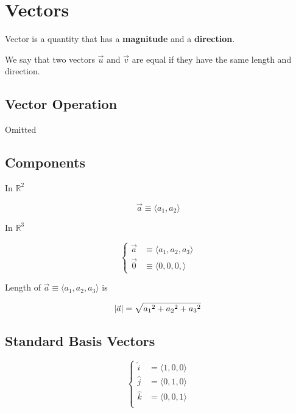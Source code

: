 \section{Vectors}

\begin{definition}[Vector]
	Vector is a quantity that has a \textbf{magnitude} and a \textbf{direction}.
\end{definition}

We say that two vectors $\vec{u}$ and $\vec{v}$ are equal if they have the same length and direction.

\subsection{Vector Operation}

Omitted

\subsection{Components}

In $\mathbb{R}^2$

\begin{equation}
	\vec{a} \equiv \langle a_1, a_2 \rangle
\end{equation}

In $\mathbb{R}^3$

\begin{equation}
	\begin{cases}
		\vec{a} &\equiv \langle a_1, a_2, a_3 \rangle\\
		\vec{0} &\equiv \langle 0, 0, 0, \rangle
	\end{cases}
\end{equation}

\begin{definition}
	Length of $\vec{a} \equiv \langle a_1, a_2, a_3 \rangle$ is

	\begin{equation}
		\abs{\vec{a}} = \sqrt{{a_1}^2 + {a_2}^2 + {a_3}^2}
	\end{equation}
\end{definition}

\subsection{Standard Basis Vectors}

\begin{equation}
	\begin{cases}
		\hat{i} &= \langle 1, 0, 0 \rangle\\
		\hat{j} &= \langle 0, 1, 0 \rangle\\
		\hat{k} &= \langle 0, 0, 1 \rangle\\
	\end{cases}
\end{equation}

